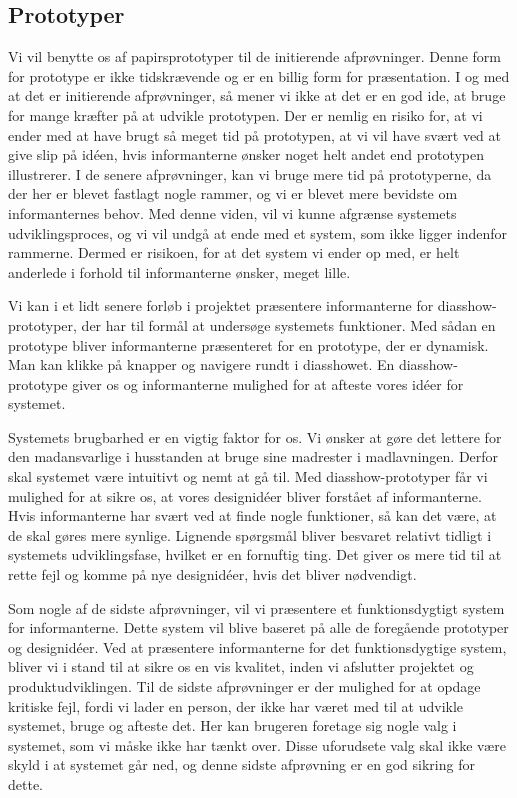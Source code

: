 \subsection{Prototyper}
\label{subsec:prototyper}

Vi vil benytte os af papirsprototyper til de initierende afprøvninger. Denne form for prototype er ikke tidskrævende og er en billig form for præsentation. I og med at det er initierende afprøvninger, så mener vi ikke at det er en god ide, at bruge for mange kræfter på at udvikle prototypen. Der er nemlig en risiko for, at vi ender med at have brugt så meget tid på prototypen, at vi vil have svært ved at give slip på idéen, hvis informanterne ønsker noget helt andet end prototypen illustrerer. I de senere afprøvninger, kan vi bruge mere tid på prototyperne, da der her er blevet fastlagt nogle rammer, og vi er blevet mere bevidste om informanternes behov. Med denne viden, vil vi kunne afgrænse systemets udviklingsproces, og vi vil undgå at ende med et system, som ikke ligger indenfor rammerne. Dermed er risikoen, for at det system vi ender op med, er helt anderlede i forhold til informanterne ønsker, meget lille.

Vi kan i et lidt senere forløb i projektet præsentere informanterne for diasshow-prototyper, der har til formål at undersøge systemets funktioner. Med sådan en prototype bliver informanterne præsenteret for en prototype, der er dynamisk. Man kan klikke på knapper og navigere rundt i diasshowet. En diasshow-prototype giver os og informanterne mulighed for at afteste vores idéer for systemet. 

Systemets brugbarhed er en vigtig faktor for os. Vi ønsker at gøre det lettere for den madansvarlige i husstanden at bruge sine madrester i madlavningen. Derfor skal systemet være intuitivt og nemt at gå til. Med diasshow-prototyper får vi mulighed for at sikre os, at vores designidéer bliver forstået af informanterne. Hvis informanterne \fx har svært ved at finde nogle funktioner, så kan det være, at de skal gøres mere synlige. Lignende spørgsmål bliver besvaret relativt tidligt i systemets udviklingsfase, hvilket er en fornuftig ting. Det giver os mere tid til at rette fejl og komme på nye designidéer, hvis det bliver nødvendigt.

Som nogle af de sidste afprøvninger, vil vi præsentere et funktionsdygtigt system for informanterne. Dette system vil blive baseret på alle de foregående prototyper og designidéer. Ved at præsentere informanterne for det funktionsdygtige system, bliver vi i stand til at sikre os en vis kvalitet, inden vi afslutter projektet og produktudviklingen. Til de sidste afprøvninger er der mulighed for at opdage kritiske fejl, fordi vi lader en person, der ikke har været med til at udvikle systemet, bruge og afteste det. Her kan brugeren foretage sig nogle valg i systemet, som vi måske ikke har tænkt over. Disse uforudsete valg skal ikke være skyld i at systemet går ned, og denne sidste afprøvning er en god sikring for dette. 

